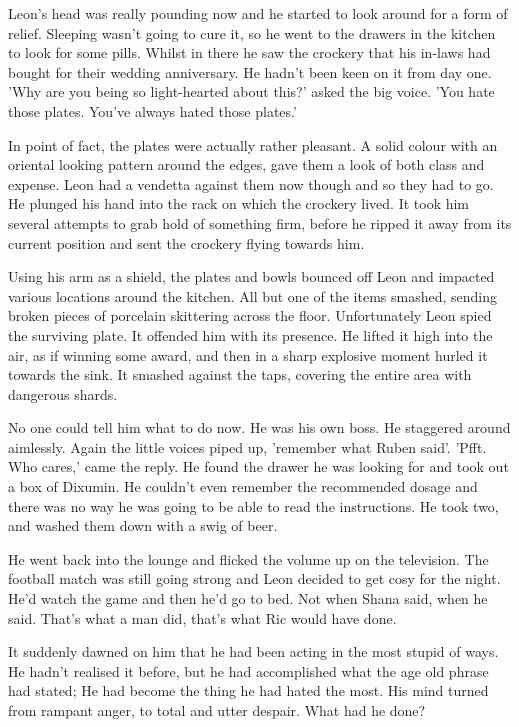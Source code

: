 Leon's head was really pounding now and he started to look around for a form of relief.  Sleeping wasn't going to cure it, so he went to the drawers in the kitchen to look for some pills.  Whilst in there he saw the crockery that his in-laws had bought for their wedding anniversary.  He hadn't been keen on it from day one.  'Why are you being so light-hearted about this?' asked the big voice.  'You hate those plates.  You've always hated those plates.'  

In point of fact, the plates were actually rather pleasant.  A solid colour with an oriental looking pattern around the edges, gave them a look of both class and expense.  Leon had a vendetta against them now though and so they had to go.  He plunged his hand into the rack on which the crockery lived.  It took him several attempts to grab hold of something firm, before he ripped it away from its current position and sent the crockery flying towards him.  

Using his arm as a shield, the plates and bowls bounced off Leon and impacted various locations around the kitchen.  All but one of the items smashed, sending broken pieces of porcelain skittering across the floor.  Unfortunately Leon spied the surviving plate.  It offended him with its presence.  He lifted it high into the air, as if winning some award, and then in a sharp explosive moment hurled it towards the sink.  It smashed against the taps, covering the entire area with dangerous shards.

No one could tell him what to do now.  He was his own boss.  He staggered around aimlessly.  Again the little voices piped up, 'remember what Ruben said'.  'Pfft.  Who cares,' came the reply.  He found the drawer he was looking for and took out a box of Dixumin.  He couldn't even remember the recommended dosage and there was no way he was going to be able to read the instructions.  He took two, and washed them down with a swig of beer.  

He went back into the lounge and flicked the volume up on the television.  The football match was still going strong and Leon decided to get cosy for the night.  He'd watch the game and then he'd go to bed.  Not when Shana said, when he said.  That's what a man did, that's what Ric would have done.  

It suddenly dawned on him that he had been acting in the most stupid of ways.  He hadn't realised it before, but he had accomplished what the age old phrase had stated; He had become the thing he had hated the most.  His mind turned from rampant anger, to total and utter despair.  What had he done?

